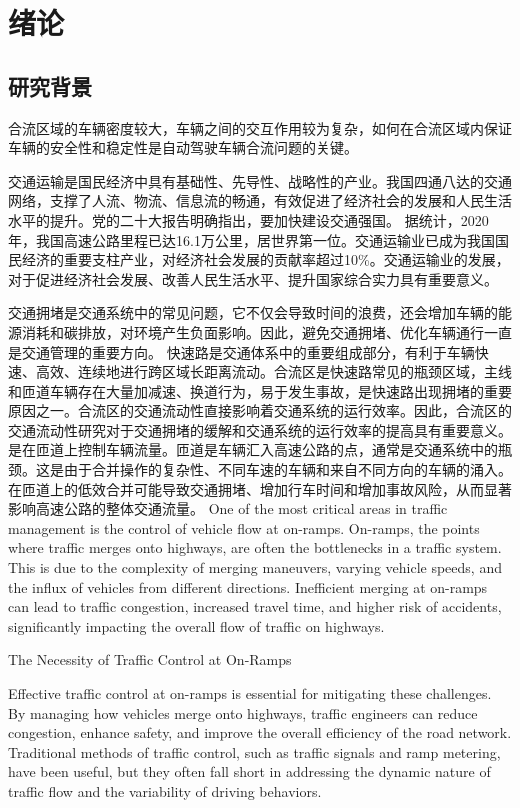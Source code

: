 \chapter{绪论}
\label{cha:intro}
\section{研究背景}

合流区域的车辆密度较大，车辆之间的交互作用较为复杂，如何在合流区域内保证车辆的安全性和稳定性是自动驾驶车辆合流问题的关键。

交通运输是国民经济中具有基础性、先导性、战略性的产业。我国四通八达的交通网络，支撑了人流、物流、信息流的畅通，有效促进了经济社会的发展和人民生活水平的提升。党的二十大报告明确指出，要加快建设交通强国。
据统计，2020年，我国高速公路里程已达16.1万公里，居世界第一位。交通运输业已成为我国国民经济的重要支柱产业，对经济社会发展的贡献率超过10\%。交通运输业的发展，对于促进经济社会发展、改善人民生活水平、提升国家综合实力具有重要意义。

交通拥堵是交通系统中的常见问题，它不仅会导致时间的浪费，还会增加车辆的能源消耗和碳排放，对环境产生负面影响。因此，避免交通拥堵、优化车辆通行一直是交通管理的重要方向。
快速路是交通体系中的重要组成部分，有利于车辆快速、高效、连续地进行跨区域长距离流动。合流区是快速路常见的瓶颈区域，主线和匝道车辆存在大量加减速、换道行为，易于发生事故，是快速路出现拥堵的重要原因之一。合流区的交通流动性直接影响着交通系统的运行效率。因此，合流区的交通流动性研究对于交通拥堵的缓解和交通系统的运行效率的提高具有重要意义。
是在匝道上控制车辆流量。匝道是车辆汇入高速公路的点，通常是交通系统中的瓶颈。这是由于合并操作的复杂性、不同车速的车辆和来自不同方向的车辆的涌入。在匝道上的低效合并可能导致交通拥堵、增加行车时间和增加事故风险，从而显著影响高速公路的整体交通流量。
One of the most critical areas in traffic management is the control of vehicle flow at on-ramps. On-ramps, the points where traffic merges onto highways, are often the bottlenecks in a traffic system. This is due to the complexity of merging maneuvers, varying vehicle speeds, and the influx of vehicles from different directions. Inefficient merging at on-ramps can lead to traffic congestion, increased travel time, and higher risk of accidents, significantly impacting the overall flow of traffic on highways.

The Necessity of Traffic Control at On-Ramps

Effective traffic control at on-ramps is essential for mitigating these challenges. By managing how vehicles merge onto highways, traffic engineers can reduce congestion, enhance safety, and improve the overall efficiency of the road network. Traditional methods of traffic control, such as traffic signals and ramp metering, have been useful, but they often fall short in addressing the dynamic nature of traffic flow and the variability of driving behaviors.

